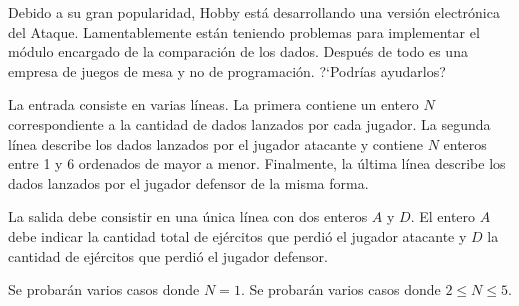 \documentclass{oci}
\begin{document}
\begin{problemDescription}
\begin{center}
  \end{center}

  Debido a su gran popularidad, Hobby está desarrollando una versión electrónica
  del Ataque.
  Lamentablemente están teniendo problemas para implementar el módulo encargado
  de la comparación de los dados.
  Después de todo es una empresa de juegos de mesa y no de programación.
  ?`Podrías ayudarlos?

\end{problemDescription}

\begin{inputDescription}
  La entrada consiste en varias líneas.
  La primera contiene un entero $N$ correspondiente a la cantidad de
  dados lanzados por cada jugador.
  La segunda línea describe los dados lanzados por el jugador
  atacante y contiene $N$ enteros entre 1 y 6 ordenados de mayor a menor.
  Finalmente, la última línea describe los dados lanzados por el jugador defensor de
  la misma forma.
\end{inputDescription}

\begin{outputDescription}
  La salida debe consistir en una única línea con dos enteros $A$ y $D$.
  El entero $A$ debe indicar la cantidad total de ejércitos que perdió el
  jugador atacante y $D$ la cantidad de ejércitos que perdió el jugador
  defensor.
\end{outputDescription}

\begin{scoreDescription}
   Se probarán varios casos donde $N=1$.
   Se probarán varios casos donde $2\leq N \leq 5$.
\end{scoreDescription}

\begin{sampleDescription}
\end{sampleDescription}
\end{document}
